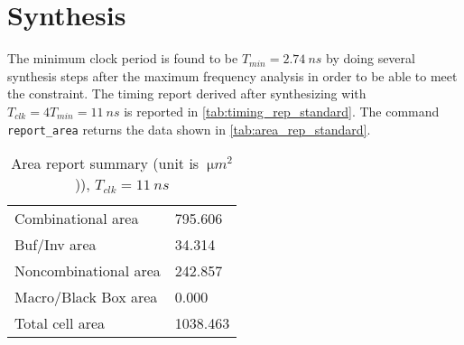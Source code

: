 \chapter{Synthesis}
The minimum clock period is found to be $T_{min}=\SI{2.74}{ns}$ by doing several synthesis steps after the maximum frequency analysis in order to be able to meet the constraint. The timing report derived after synthesizing with $T_{clk}=4T_{min}=\SI{11}{ns}$ is reported in \autoref{tab:timing_rep_standard}.
The command \texttt{report\_area} returns the data shown in \autoref{tab:area_rep_standard}.

\begin{table}[htbp]
	\centering
	\begin{tabular}{|l|l|}\hline
		Combinational area&                795.606\\
		Buf/Inv area&                       34.314\\
		Noncombinational area&             242.857\\
		Macro/Black Box area&                0.000\\
		Total cell area&                  1038.463\\\hline
		\end{tabular}
	\caption{Area report summary (unit is $\SI{}{\micro m ^2}$)), $T_{clk} = \SI{11}{ns}$}
	\label{tab:area_rep_standard}
\end{table}




